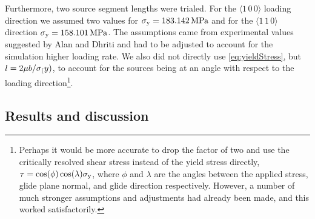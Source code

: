 Furthermore, two source segment lengths were trialed. For the $\langle 1\, 0\, 0 \rangle$ loading direction we assumed two values for $\sigma_{\textrm{y}} = \SI{183, 142}{\mega\pascal}$ and for the $\langle 1\, 1\, 0 \rangle$ direction $\sigma_{\textrm{y}} = \SI{158, 101}{\mega\pascal}$. The assumptions came from experimental values suggested by Alan and Dhriti and had to be adjusted to account for the simulation higher loading rate. We also did not directly use \cref{eq:yieldStress}, but $l = 2 \mu b / \sigma_{\textrm{(}}y)$, to account for the sources being at an angle with respect to the loading direction\footnote{Perhaps it would be more accurate to drop the factor of two and use the critically resolved shear stress instead of the yield stress directly, $\tau = \cos(\phi)\cos(\lambda) \sigma_{\textrm{y}}$, where $\phi$ and $\lambda$ are the angles between the applied stress, glide plane normal, and glide direction respectively. However, a number of much stronger assumptions and adjustments had already been made, and this worked satisfactorily.}.

\subsection{Results and discussion}
\label{sc:NiResults}

